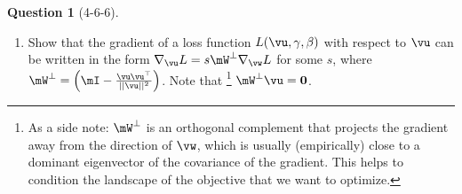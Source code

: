 \documentclass[12pt]{article}
\theoremstyle{definition}
\newtheorem{exercise}{Question}%
\begin{document}
\begin{exercise}[4-6-6]
{\begin{enumerate}[label=\arabic{exercise}.\arabic*]
Consider one layer of a neural network, and omit the bias parameter. 
To carry out batch normalization, one normally standardizes the preactivation and performs elementwise scale and shift $\hat{y}=\gamma\cdot\frac{y-\mu_y}{\sigma_y}+\beta$ where $y=\vu^\top\vx$. 
Assume the data $\vx$ (a random vector) is whitened ($\Var(\vx)=\mI$) and centered at $0$  ($\E[\vx]=\mathbf{0}$). 
Show that $\hat{y}=\vw^\top\vx+\beta$. 
\item Show that the gradient of a loss function $L(\vu,\gamma,\beta)$ with respect to $\vu$ can be written in the form $\nabla_\vu L=s\mW^\perp\nabla_\vw L$ for some $s$, where $\mW^\perp=\left(\mI-\frac{\vu\vu^\top}{||\vu||^2}\right)$.
Note that \footnote{As a side note: $\mW^\perp$ is an orthogonal complement that projects the gradient away from the direction of $\vw$, which is usually (empirically) close to a dominant eigenvector of the covariance of the gradient. This helps to condition the landscape of the objective that we want to optimize.} $\mW^\perp\vu=\mathbf{0}$.

\end{enumerate}
}


\end{exercise}
\end{document}
